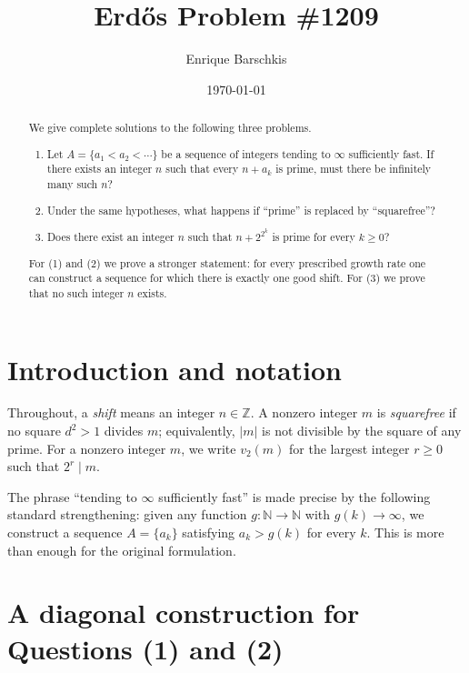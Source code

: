 \documentclass[11pt]{article}
\title{\texorpdfstring{Erd\H{o}s Problem \#1209}{Erdos Problem \#1209}}
\author{Enrique Barschkis}
\date{\today}
\newif\ifuseenumitem
\newenvironment{arabicparts}
{\ifuseenumitem
  \begin{enumerate}[label=(\arabic*)]\else
    \begin{enumerate}\renewcommand{\labelenumi}{(\arabic{enumi})}\fi}
        {
      \end{enumerate}}
\theoremstyle{remark}
\begin{document}
        \maketitle

        \begin{abstract}
          We give complete solutions to the following three problems.

          \begin{arabicparts}
          \item Let $A=\{a_1<a_2<\cdots\}$ be a sequence of integers tending to $\infty$ sufficiently fast. If there exists an integer $n$ such that every $n+a_k$ is prime, must there be infinitely many such $n$?
          \item Under the same hypotheses, what happens if ``prime'' is replaced by ``squarefree''?
          \item Does there exist an integer $n$ such that $n+2^{2^k}$ is prime for every $k\ge 0$?
          \end{arabicparts}

          For \textup{(1)} and \textup{(2)} we prove a stronger statement: for every prescribed growth rate one can construct a sequence for which there is exactly one good shift. For \textup{(3)} we prove that no such integer $n$ exists.
        \end{abstract}

        \section{Introduction and notation}

        Throughout, a \emph{shift} means an integer $n\in\mathbb Z$. A nonzero integer $m$ is \emph{squarefree} if no square $d^2>1$ divides $m$; equivalently, $|m|$ is not divisible by the square of any prime. For a nonzero integer $m$, we write $v_2(m)$ for the largest integer $r\ge 0$ such that $2^r\mid m$.

        The phrase ``tending to $\infty$ sufficiently fast'' is made precise by the following standard strengthening: given any function $g\colon \mathbb N\to\mathbb N$ with $g(k)\to\infty$, we construct a sequence $A=\{a_k\}$ satisfying $a_k>g(k)$ for every $k$. This is more than enough for the original formulation.

        \section{A diagonal construction for Questions \textup{(1)} and \textup{(2)}}
\end{document}
